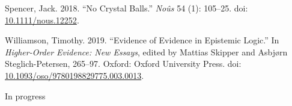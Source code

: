 \documentclass[
  10pt,
  letterpaper,
  DIV=11,
  numbers=noendperiod,
  twoside]{scrartcl}
\newlength{\cslhangindent}
\newenvironment{CSLReferences}[2] %
 {\begin{list}{}{%
  \setlength{\itemindent}{0pt}
  \setlength{\leftmargin}{0pt}
  \setlength{\parsep}{0pt}
  \ifodd #1
   \setlength{\leftmargin}{\cslhangindent}
   \setlength{\itemindent}{-1\cslhangindent}
  \fi
  \setlength{\itemsep}{#2\baselineskip}}}
 {\end{list}}
\begin{document}
\begin{CSLReferences}{1}{0}
Spencer, Jack. 2018. {``No Crystal Balls.''} \emph{Noûs} 54 (1):
105--25. doi:
\href{https://doi.org/10.1111/nous.12252}{10.1111/nous.12252}.

Williamson, Timothy. 2019. {``Evidence of Evidence in Epistemic
Logic.''} In \emph{Higher-Order Evidence: New Essays}, edited by Mattias
Skipper and Asbjørn Steglich-Petersen, 265--97. Oxford: {O}xford
{U}niversity {P}ress. doi:
\href{https://doi.org/10.1093/oso/9780198829775.003.0013}{10.1093/oso/9780198829775.003.0013}.

\end{CSLReferences}



\noindent \vspace{1in} In progress
\end{document}
